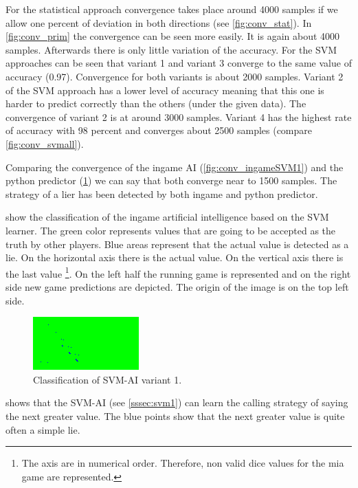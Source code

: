 \documentclass[11pt]{article}
\begin{document}
For the statistical approach convergence takes place around 4000 samples if we allow one percent of deviation in both directions (see \cref{fig:conv_stat}). 
In \cref{fig:conv_prim} the convergence can be seen more easily. It is again about 4000 samples. Afterwards there is only little variation of the accuracy. 
For the SVM approaches can be seen that variant 1 and variant 3 converge to the same value of accuracy (0.97). Convergence for both variants is about 2000 samples. Variant 2 of the SVM approach has a lower level of accuracy meaning that this one is harder to predict correctly than the others (under the given data). The convergence of variant 2 is at around 3000 samples. Variant 4 has the highest rate of accuracy with 98 percent and converges about 2500 samples (compare \cref{fig:conv_svmall}).

Comparing the convergence of the ingame AI (\cref{fig:conv_ingameSVM1}) and the python predictor (\cref{fig:svm1}) we can say that both converge near to 1500 samples. 
The strategy of a lier has been detected by both ingame and python predictor. 

 show the classification of the ingame artificial intelligence based on the SVM learner.
The green color represents values that are going to be accepted as the truth by other players. Blue areas represent that the actual value is detected as a lie.
On the horizontal axis there is the actual value. On the vertical axis there is the last value \footnote{The axis are in numerical order. Therefore, non valid dice values for the mia game are represented.}. 
On the left half the running game is represented and on the right side new game predictions are depicted. The origin of the image is on the top left side. 

\begin{figure}[H]
	\centering
	\includegraphics[width=.45\textwidth]{../testdata/svm1.png}
	\caption{Classification of SVM-AI variant 1.}
	\label{fig:svm1}
\end{figure}

 shows that the SVM-AI (see \cref{sssec:svm1}) can learn the calling strategy of saying the next greater value. The blue points show that the next greater value is quite often a simple lie.
\end{document}
